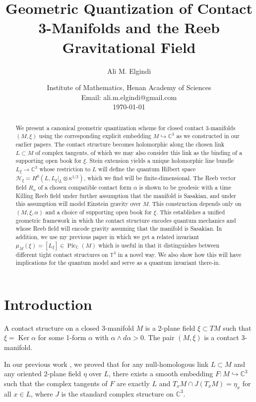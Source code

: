 \documentclass[12pt]{article}
\title{Geometric Quantization of Contact 3-Manifolds and the Reeb Gravitational Field}
\author{Ali M. Elgindi}
\date{Institute of Mathematics, Henan Academy of Sciences\\
\medskip
Email: ali.m.elgindi@gmail.com\\
\medskip
\today}
\newcommand{\C}{\mathbb{C}}
\newcommand{\T}{\mathbb{T}}
\newcommand{\Hilb}{\mathcal{H}}
\newcommand{\Pic}{\operatorname{Pic}}
\newcommand{\Ker}{\operatorname{Ker}}
\begin{document}
\maketitle

\begin{abstract}
We present a canonical geometric quantization scheme for closed contact 3-manifolds $(M,\xi)$ using the corresponding explicit embedding $M \hookrightarrow \C^3$ as we constructed in our earlier papers. The contact structure becomes holomorphic along the chosen link $L \subset M$ of complex tangents, of which we may also consider this link as the binding of a supporting open book for $\xi$. Stein extension yields a unique holomorphic line bundle $L_\xi \to \C^3$ whose restriction to $L$ will define the quantum Hilbert space $\Hilb_\xi = H^0(L, L_\xi|_L \otimes \kappa^{1/2})$, which we find will be finite-dimensional. The Reeb vector field $R_\alpha$ of a chosen compatible contact form $\alpha$ is shown to be geodesic with a time Killing Reeb field under further assumption that the manifold is Sasakian, and under this assumption will model Einstein gravity over $M$. This construction depends only on $(M,\xi,\alpha)$ and a choice of supporting open book for $\xi$. This establishes a unified geometric framework in which the contact structure encodes quantum mechanics and whose Reeb field will encode gravity assuming that the manifold is Sasakian. In addition, we use my previous paper in which we get a related invariant $\mu_M(\xi) = [L_\xi] \in \Pic_\C(M)$ which is useful in that it distinguishes between different tight contact structures on $\T^3$ in a novel way. We also show how this will  have implications for the quantum model and serve as a quantum invariant there-in.
\end{abstract}

\section{Introduction}

A contact structure on a closed 3-manifold $M$ is a 2-plane field $\xi \subset TM$ such that $\xi = \Ker \alpha$ for some 1-form $\alpha$ with $\alpha \wedge d\alpha > 0$. The pair $(M,\xi)$ is a contact 3-manifold.

In our previous work \cite{Elgindi2025}, we proved that for any null-homologous link $L \subset M$ and any oriented 2-plane field $\eta$ over $L$, there exists a smooth embedding $F: M \hookrightarrow \C^3$ such that the complex tangents of $F$ are exactly $L$ and $T_xM \cap J(T_xM) = \eta_x$ for all $x \in L$, where $J$ is the standard complex structure on $\C^3$.
\end{document}
